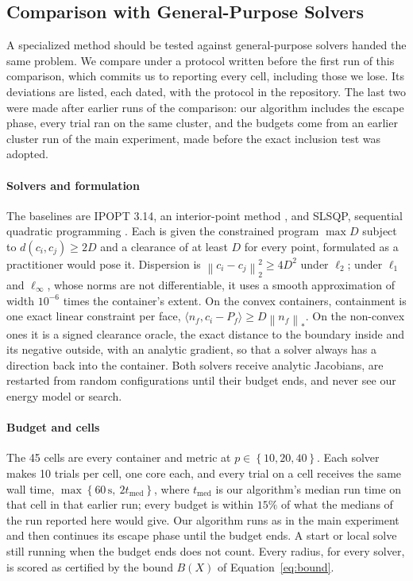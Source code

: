 \documentclass[preprint,12pt]{elsarticle}
\theoremstyle{remark}
\newcommand{\ang}[1]{\langle #1 \rangle}
\newcommand{\set}[1]{\left\{ #1 \right\}}
\def \norm#1{\left\|#1 \right\|}
\begin{document}
\subsection{Comparison with General-Purpose Solvers}\label{sec:baselines}

A specialized method should be tested against general-purpose solvers handed the
same problem. We compare under a protocol written before the first run of this
comparison, which commits us to reporting every cell, including those we lose.
Its deviations are listed, each dated, with the protocol in the repository. The
last two were made after earlier runs of the comparison: our algorithm includes
the escape phase, every trial ran on the same cluster, and the budgets come from
an earlier cluster run of the main experiment, made before the exact inclusion
test was adopted.

\paragraph{Solvers and formulation} The baselines are IPOPT 3.14, an
interior-point method \citep{wachter2006}, and SLSQP, sequential quadratic
programming \citep{kraft1988, scipy2020}. Each is given the constrained program
$\max D$ subject to $d(c_i, c_j) \ge 2D$ and a clearance of at least $D$ for
every point, formulated as a practitioner would pose it. Dispersion is
$\norm{c_i - c_j}_2^2 \ge 4D^2$ under $\ell_2$; under $\ell_1$ and
$\ell_\infty$, whose norms are not differentiable, it uses a smooth
approximation of width $10^{-6}$ times the container's extent. On the convex
containers, containment is one exact linear constraint per face, $\ang{n_f, c_i
- P_f} \ge D \norm{n_f}_*$. On the non-convex ones it is a signed clearance
oracle, the exact distance to the boundary inside and its negative outside, with
an analytic gradient, so that a solver always has a direction back into the
container. Both solvers receive analytic Jacobians, are restarted from random
configurations until their budget ends, and never see our energy model or
search.

\paragraph{Budget and cells} The 45 cells are every container and metric at $p
\in \set{10, 20, 40}$. Each solver makes 10 trials per cell, one core each, and
every trial on a cell receives the same wall time, $\max \set{60\,\text{s},\ 2
t_{\text{med}}}$, where $t_{\text{med}}$ is our algorithm's median run time on
that cell in that earlier run; every budget is within $15\%$ of what the medians
of the run reported here would give. Our algorithm runs as in the main
experiment and then continues its escape phase until the budget ends. A start or
local solve still running when the budget ends does not count. Every radius, for
every solver, is scored as certified by the bound $B(X)$ of
Equation~\ref{eq:bound}.
\end{document}
